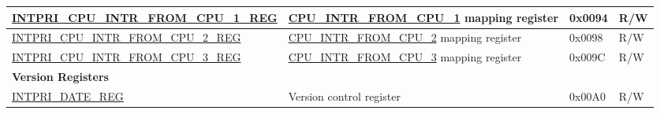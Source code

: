 \begin{longtable}{ | p{10cm} | p{10cm} | p{1.3cm} | p{1cm} | }
\hyperref[regdesc:INTPRICPUINTRFROMCPUNREG]{INTPRI\_CPU\_INTR\_FROM\_CPU\_1\_REG} & \hyperref[CPUINTRFROMCPU0]{CPU\_INTR\_FROM\_CPU\_1} mapping register & 0x0094 & R/W \\ \hline
\hyperref[regdesc:INTPRICPUINTRFROMCPUNREG]{INTPRI\_CPU\_INTR\_FROM\_CPU\_2\_REG} & \hyperref[CPUINTRFROMCPU0]{CPU\_INTR\_FROM\_CPU\_2} mapping register & 0x0098 & R/W \\ \hline
\hyperref[regdesc:INTPRICPUINTRFROMCPUNREG]{INTPRI\_CPU\_INTR\_FROM\_CPU\_3\_REG} & \hyperref[CPUINTRFROMCPU0]{CPU\_INTR\_FROM\_CPU\_3} mapping register & 0x009C & R/W \\ \hline
\multicolumn{4}{|l|}{\textbf{Version Registers}} \\ \hline
\hyperref[regdesc:INTPRIDATEREG]{INTPRI\_DATE\_REG} & Version control register & 0x00A0 & R/W \\ \hline
\end{longtable}
